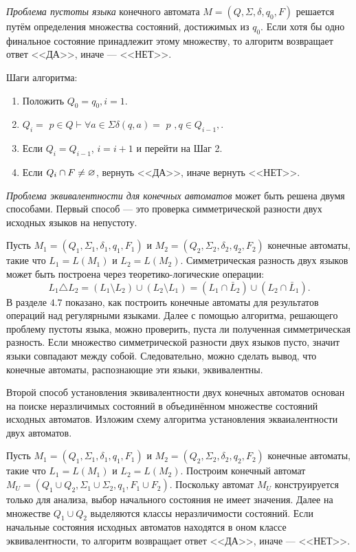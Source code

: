 \textit{Проблема пустоты языка} конечного автомата $M = (Q,\Sigma, \delta, q_0, F)$ решается путём определения множества состояний, достижимых из $q_0$. Если хотя бы одно финальное состояние принадлежит этому множеству, то алгоритм возвращает ответ <<ДА>>, иначе --- <<НЕТ>>.

Шаги алгоритма:
\begin{enumerate}
\item Положить $Q_0 = { q_0 }, i = 1$.
\item $Q_i = $ {$p \in Q \vdash \forall a \in \Sigma \delta(q, a) = $ {$ p $} $, q \in Q_{i-1},$}.
\item Если $Q_i = Q_{i-1}$, $i = i + 1$ и перейти на Шаг 2.
\item Если $Q_i \cap F \neq \varnothing$, вернуть <<ДА>>, иначе вернуть <<НЕТ>>.
\end{enumerate}

\textit{Проблема эквивалентности для конечных автоматов} может быть решена двумя способами. Первый способ --- это проверка симметрической разности двух исходных языков на непустоту.

Пусть $M_1 = (Q_1,\Sigma_1, \delta_1, q_1, F_1)$ и $M_2 = (Q_2,\Sigma_2, \delta_2, q_2, F_2)$ конечные автоматы, такие что $L_1 = L(M_1)$ и $L_2 = L(M_2)$. Симметрическая разность двух языков может быть построена через теоретико-логические операции:
\[ L_1 \triangle L_2 = (L_1 \setminus L_2) \cup(L_2 \setminus L_1) = (L_1 \cap \bar L_2) \cup (L_2 \cap \bar L_1). \]
В разделе $4.7$ показано, как построить конечные автоматы для результатов операций над регулярными языками. Далее с помощью алгоритма, решающего проблему пустоты языка, можно проверить, пуста ли полученная симметрическая разность. Если множество симметрической разности двух языков пусто, значит языки совпадают между собой. Следовательно, можно сделать вывод, что конечные автоматы, распознающие эти языки, эквивалентны.

Второй способ установления эквивалентности двух конечных автоматов основан на поиске неразличимых состояний в объединённом множестве состояний исходных автоматов. Изложим схему алгоритма установления экваиалентности двух автоматов.

Пусть $M_1 = (Q_1,\Sigma_1, \delta_1, q_1, F_1)$ и $M_2 = (Q_2,\Sigma_2, \delta_2, q_2, F_2)$ конечные автоматы, такие что $L_1 = L(M_1)$ и $L_2 = L(M_2)$. Построим конечный автомат $M_U = (Q_1 \cup Q_2, \Sigma_1 \cup \Sigma_2, q_1, F_1 \cup F_2)$. Поскольку автомат $M_U$ конструируется только для анализа, выбор начального состояния не имеет значения. Далее на множестве $Q_1 \cup Q_2$ выделяются классы неразличимости состояний. Если начальные состояния исходных автоматов находятся в оном классе эквивалентности, то алгоритм возвращает ответ <<ДА>>, иначе --- <<НЕТ>>.

